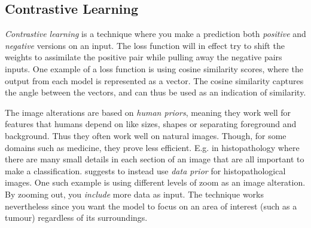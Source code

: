 \documentclass[10pt,twocolumn,letterpaper]{article}
\begin{document}

\subsection{Contrastive Learning}
\label{sec:contrastiveLearning}
\textit{Contrastive learning} is a technique where you make a prediction both \textit{positive} and \textit{negative} versions on an input. The loss function will in effect try to shift the weights to assimilate the positive pair while pulling away the negative pairs inputs. One example of a loss function is using cosine similarity scores, where the output from each model is represented as a vector. The cosine similarity captures the angle between the vectors, and can thus be used as an indication of similarity. 

The image alterations are based on \textit{human priors}, meaning they work well for features that humans depend on like sizes, shapes or separating foreground and background. Thus they often work well on natural images. Though, for some domains such as medicine, they prove less efficient. E.g. in histopathology where there are many small details in each section of an image that are all important to make a classification. \cite{dataPriors} suggests to instead use \textit{data prior} for histopathological images. One such example is using different levels of zoom as an image alteration. By zooming out, you \textit{include} more data as input. The technique works nevertheless since you want the model to focus on an area of interest (such as a tumour) regardless of its surroundings.
\end{document}
